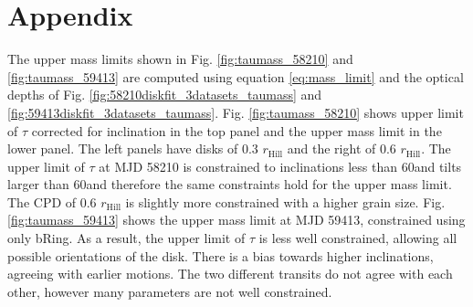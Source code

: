 
\clearpage

\section{Appendix}\label{sec:appendix}


The upper mass limits shown in Fig. \ref{fig:taumass_58210} and \ref{fig:taumass_59413} are computed using equation \ref{eq:mass_limit} and the optical depths of Fig. \ref{fig:58210diskfit_3datasets_taumass} and \ref{fig:59413diskfit_3datasets_taumass}.
%
%
%
%
Fig. \ref{fig:taumass_58210} shows upper limit of $\tau$ corrected for inclination in the top panel and the upper mass limit in the lower panel. 
%
The left panels have disks of 0.3 $r_{\text{Hill}}$ and the right of 0.6 $r_{\text{Hill}}$. 
%
The upper limit of $\tau$ at MJD 58210 is constrained to inclinations less than 60\textdegree and tilts larger than 60\textdegree and therefore the same constraints hold for the upper mass limit. 
%
The CPD of 0.6 $r_{\text{Hill}}$ is slightly more constrained with a higher grain size. 
%
Fig. \ref{fig:taumass_59413} shows the upper mass limit at MJD 59413, constrained using only bRing.
%
As a result, the upper limit of $\tau$ is less well constrained, allowing all possible orientations of the disk.  
%
There is a bias towards higher inclinations, agreeing with earlier motions.
%
The two different transits do not agree with each other, however many parameters are not well constrained. 

